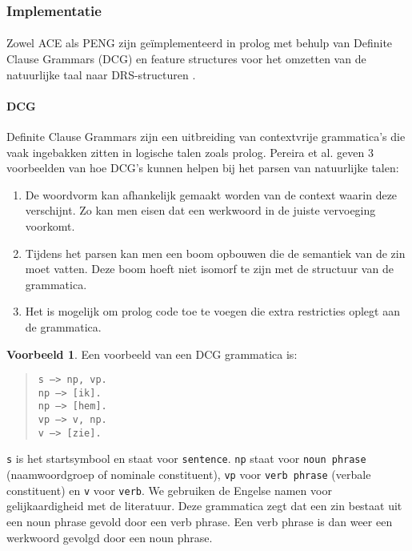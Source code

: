 \documentclass[]{article}
\theoremstyle{definition}
\newtheorem{ex}{Voorbeeld}[section]
\begin{document}
\subsubsection{Implementatie}
\paragraph{} Zowel ACE als PENG zijn geïmplementeerd in prolog met behulp van Definite Clause Grammars (DCG) en feature structures voor het omzetten van de natuurlijke taal naar DRS-structuren \cite{Fuchs2008, Schwitter2006}.

\paragraph{DCG} Definite Clause Grammars \cite{Pereira1980} zijn een uitbreiding van contextvrije grammatica's die vaak ingebakken zitten in logische talen zoals prolog. Pereira et al. \cite{Pereira1980} geven 3 voorbeelden van hoe DCG's kunnen helpen bij het parsen van natuurlijke talen:

\begin{enumerate}
  \item De woordvorm kan afhankelijk gemaakt worden van de context waarin deze verschijnt. Zo kan men eisen dat een werkwoord in de juiste vervoeging voorkomt.
  \item Tijdens het parsen kan men een boom opbouwen die de semantiek van de zin moet vatten. Deze boom hoeft niet isomorf te zijn met de structuur van de grammatica.
  \item Het is mogelijk om prolog code toe te voegen die extra restricties oplegt aan de grammatica.
\end{enumerate}

\begin{ex}
  Een voorbeeld van een DCG grammatica is:
  \begin{quote}
    \texttt{s ---> np, vp.} \\
    \texttt{np ---> [ik].} \\
    \texttt{np ---> [hem].} \\
    \texttt{vp ---> v, np.} \\
    \texttt{v ---> [zie].}
  \end{quote}
\end{ex} 
\texttt{s} is het startsymbool en staat voor \texttt{sentence}. \texttt{np} staat voor \texttt{noun phrase} (naamwoordgroep of nominale constituent), \texttt{vp} voor \texttt{verb phrase} (verbale constituent) en \texttt{v} voor \texttt{verb}. We gebruiken de Engelse namen voor gelijkaardigheid met de literatuur. Deze grammatica zegt dat een zin bestaat uit een noun phrase gevold door een verb phrase. Een verb phrase is dan weer een werkwoord gevolgd door een noun phrase.
\end{document}
